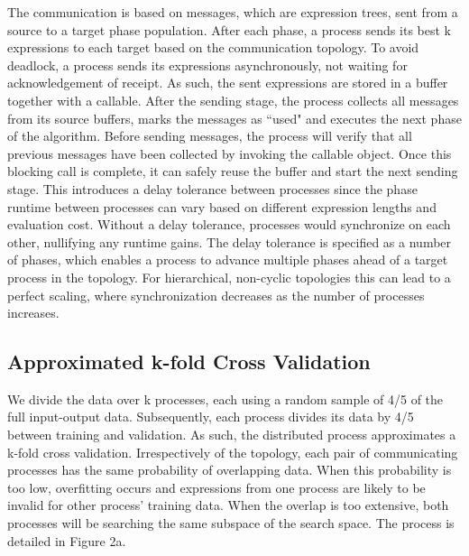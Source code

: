 The communication is based on messages, which are expression trees, sent from a source to a target phase population.
After each phase, a process sends its best k expressions to each target based on the communication topology. To avoid deadlock, a process sends its expressions asynchronously, not waiting for acknowledgement of receipt. As such, the sent expressions are stored in a buffer together with a callable. After the sending stage, the process collects all messages from its source buffers, marks the messages as ``used" and executes the next phase of the algorithm. Before sending messages, the process will verify that all previous messages have been collected by invoking the callable object. Once this blocking call is complete, it can safely reuse the buffer and start the next sending stage. This introduces a delay tolerance between processes since the phase runtime between processes can vary based on different expression lengths and evaluation cost. Without a delay tolerance, processes would synchronize on each other, nullifying any runtime gains. The delay tolerance is specified as a number of phases, which enables a process to advance multiple phases ahead of a target process in the topology. 
For hierarchical, non-cyclic topologies this can lead to a perfect scaling, where synchronization decreases as the number of processes increases.

\subsection{Approximated k-fold Cross Validation}
We divide the data over k processes, each using a random sample of 4/5 of the full input-output data. Subsequently, each process divides its data by 4/5 between training and validation. As such, the distributed process approximates a k-fold cross validation. Irrespectively of the topology, each pair of communicating processes has the same probability of overlapping data. When this probability is too low, overfitting occurs and expressions from one process are likely to be invalid for other process' training data. When the overlap is too extensive, both processes will be searching the same subspace of the search space. The process is detailed in Figure 2a.

